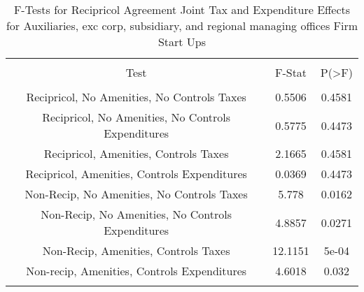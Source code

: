 
\begin{table}[!htbp] \centering 
  \caption{F-Tests for Recipricol Agreement Joint Tax and Expenditure Effects for Auxiliaries, exc corp, subsidiary, and regional managing offices Firm Start Ups} 
  \label{95Ftests} 
\begin{tabular}{@{\extracolsep{5pt}} ccc} 
\\[-1.8ex]\hline 
\hline \\[-1.8ex] 
Test & F-Stat & P(\textgreater F) \\ 
\hline \\[-1.8ex] 
Recipricol, No Amenities, No Controls Taxes & 0.5506 & 0.4581 \\ 
Recipricol, No Amenities, No Controls Expenditures & 0.5775 & 0.4473 \\ 
Recipricol, Amenities, Controls Taxes & 2.1665 & 0.4581 \\ 
Recipricol, Amenities, Controls Expenditures & 0.0369 & 0.4473 \\ 
Non-Recip, No Amenities, No Controls Taxes & 5.778 & 0.0162 \\ 
Non-Recip, No Amenities, No Controls Expenditures & 4.8857 & 0.0271 \\ 
Non-Recip, Amenities, Controls Taxes & 12.1151 & 5e-04 \\ 
Non-recip, Amenities, Controls Expenditures & 4.6018 & 0.032 \\ 
\hline \\[-1.8ex] 
\end{tabular} 
\end{table} 

